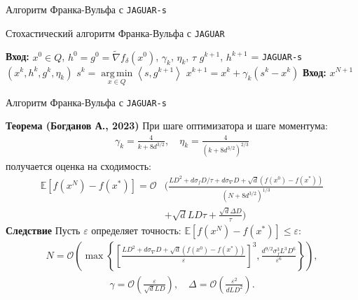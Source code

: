 \documentclass{beamer}
\DeclareMathOperator*{\argmin}{arg\,min}
\begin{document}
\begin{frame}{Алгоритм Франка-Вульфа с \texttt{JAGUAR-s}}

    \begin{algorithm}[H]
        \caption{Стохастический алгоритм Франка-Вульфа с \texttt{JAGUAR}} \label{alg:FW_stoch}
        \begin{algorithmic}[1]
        	\State \textbf{Вход:} $x^0 \in Q$, $h^0 = g^0 = \widetilde{\nabla} f_\delta (x^0)$, $\gamma_k$, $\eta_k$, $\tau$
                \State $g^{k + 1}$, $h^{k + 1}$ = \texttt{JAGUAR-s} $\left( x^k, h^k, g^k, \eta_k \right)$
                \State $s^k = \argmin\limits_{x \in Q} \left< s, g^{k + 1} \right>$
                \State $x^{k + 1} = x^k + \gamma_k (s^k - x^k)$
            \EndFor
            \State \textbf{Вход:} $x^{N + 1}$
        \end{algorithmic}
    \end{algorithm}
  
\end{frame}


\begin{frame}{Алгоритм Франка-Вульфа с \texttt{JAGUAR-s}}

    \textbf{Теорема (Богданов А., 2023)} При шаге оптимизатора и шаге моментума:
    \begin{align*}
        \gamma_k = \frac{4}{k + 8d^{3/2}}, \quad \eta_k = \frac{4}{(k + 8d^{3/2})^{2/3}}
    \end{align*}
    получается оценка на сходимость:
    \small{
        \begin{align*}
            \mathbb{E}\left[f(x^{N}) - f(x^*) \right] = \mathcal{O}
            &\Bigg(
            \frac{L D^2 + d \sigma_f D/ \tau + d \sigma_{\nabla} D + \sqrt{d} (f(x^0) - f(x^*))}{(N + 8d^{3/2})^{1/3}} \\
            &+
            \sqrt{d} L D \tau + \frac{\sqrt{d} \Delta D}{\tau} \Bigg)
        \end{align*}
    }
    \textbf{Следствие} Пусть $\varepsilon$ определяет точность: $\mathbb{E} \left[ f(x^N) - f(x^*) \right] \leq \varepsilon$:
    \begin{align*}
        N = \mathcal{O} \left( \max\left\{ \left[ \frac{L D^2 + d\sigma_{\nabla} D + \sqrt{d} (f(x^0) - f(x^*))}{\varepsilon}\right]^3 , \frac{d^{9/2} \sigma_f^3 L^3D^6}{\varepsilon^6} \right\}\right),
    \end{align*}
    \begin{align*}
        \gamma = \mathcal{O} \left(\frac{\varepsilon}{\sqrt{d} L D} \right), \quad \Delta = \mathcal{O} \left( \frac{\varepsilon^2}{d L D^2}\right).
    \end{align*}
            
\end{frame}
\end{document}
